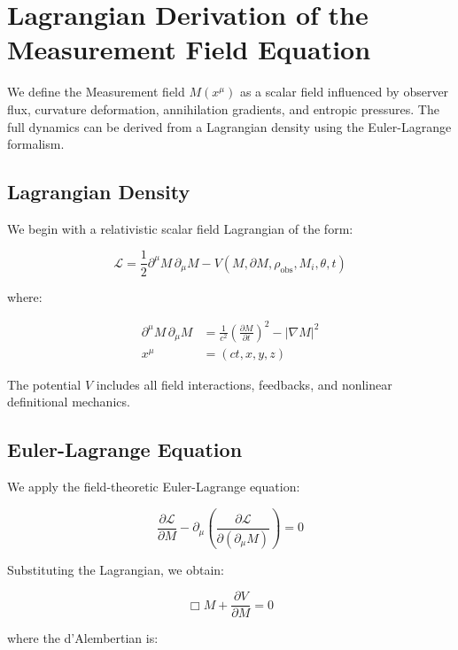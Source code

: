 \section{Lagrangian Derivation of the Measurement Field Equation}

We define the Measurement field \( M(x^\mu) \) as a scalar field influenced by observer flux, curvature deformation, annihilation gradients, and entropic pressures. The full dynamics can be derived from a Lagrangian density using the Euler-Lagrange formalism.

\subsection{Lagrangian Density}

We begin with a relativistic scalar field Lagrangian of the form:

\begin{equation}
\mathcal{L} = \frac{1}{2} \partial^\mu M \, \partial_\mu M - V(M, \partial M, \rho_{\text{obs}}, M_i, \theta, t)
\end{equation}

where:

\begin{align*}
\partial^\mu M \, \partial_\mu M &= \frac{1}{c^2} \left( \frac{\partial M}{\partial t} \right)^2 - |\nabla M|^2 \\
x^\mu &= (ct, x, y, z)
\end{align*}

The potential \( V \) includes all field interactions, feedbacks, and nonlinear definitional mechanics.

\subsection{Euler-Lagrange Equation}

We apply the field-theoretic Euler-Lagrange equation:

\begin{equation}
\frac{\partial \mathcal{L}}{\partial M} - \partial_\mu \left( \frac{\partial \mathcal{L}}{\partial(\partial_\mu M)} \right) = 0
\end{equation}

Substituting the Lagrangian, we obtain:

\begin{equation}
\Box M + \frac{\partial V}{\partial M} = 0
\end{equation}

where the d'Alembertian is:

